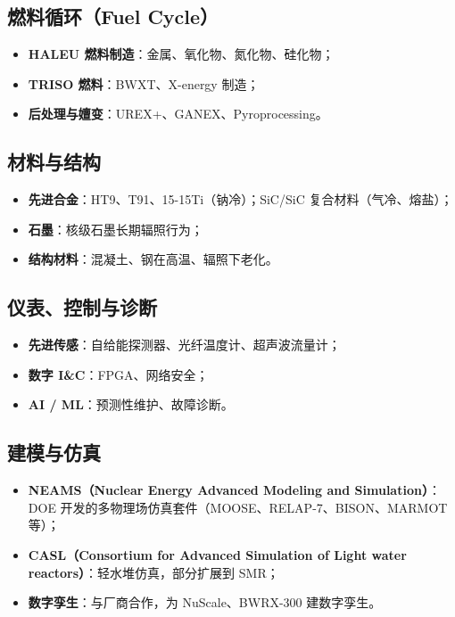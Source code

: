 \documentclass[
  UTF8,
  scheme=plain,
  fontsize=10pt,
  openany
]{ctexbook}
\begin{document}
\subsection{燃料循环（Fuel
Cycle）}\label{ux71c3ux6599ux5faaux73affuel-cycle}

\begin{itemize}
\tightlist
\item
  \textbf{HALEU 燃料制造}：金属、氧化物、氮化物、硅化物；
\item
  \textbf{TRISO 燃料}：BWXT、X-energy 制造；
\item
  \textbf{后处理与嬗变}：UREX+、GANEX、Pyroprocessing。
\end{itemize}

\subsection{材料与结构}\label{ux6750ux6599ux4e0eux7ed3ux6784}

\begin{itemize}
\tightlist
\item
  \textbf{先进合金}：HT9、T91、15-15Ti（钠冷）；SiC/SiC
  复合材料（气冷、熔盐）；
\item
  \textbf{石墨}：核级石墨长期辐照行为；
\item
  \textbf{结构材料}：混凝土、钢在高温、辐照下老化。
\end{itemize}

\subsection{仪表、控制与诊断}\label{ux4eeaux8868ux63a7ux5236ux4e0eux8bcaux65ad}

\begin{itemize}
\tightlist
\item
  \textbf{先进传感}：自给能探测器、光纤温度计、超声波流量计；
\item
  \textbf{数字 I\&C}：FPGA、网络安全；
\item
  \textbf{AI / ML}：预测性维护、故障诊断。
\end{itemize}

\subsection{建模与仿真}\label{ux5efaux6a21ux4e0eux4effux771f}

\begin{itemize}
\tightlist
\item
  \textbf{NEAMS（Nuclear Energy Advanced Modeling and Simulation）}：DOE
  开发的多物理场仿真套件（MOOSE、RELAP-7、BISON、MARMOT 等）；
\item
  \textbf{CASL（Consortium for Advanced Simulation of Light water
  reactors）}：轻水堆仿真，部分扩展到 SMR；
\item
  \textbf{数字孪生}：与厂商合作，为 NuScale、BWRX-300 建数字孪生。
\end{itemize}
\end{document}
